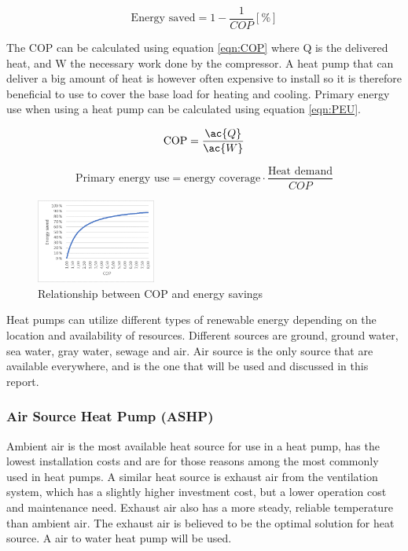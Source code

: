 \begin{equation}
    \mbox{Energy saved} = 1 - \frac{1}{COP} [\%]
    \label{eq:ES}
\end{equation}

The \ac{COP} can be calculated using equation \ref{eqn:COP} where Q is the delivered heat, and W the necessary work done by the compressor. A heat pump that can deliver a big amount of heat is however often expensive to install so it is therefore beneficial to use to cover the base load for heating and cooling. Primary energy use when using a heat pump can be calculated using equation \ref{eqn:PEU}.

\begin{equation} \label{eqn:COP}
    \mbox{COP} = \frac{\ac{Q}}{\ac{W}}
\end{equation}

\begin{equation}\label{eqn:PEU}
    \mbox{Primary energy use} = \mbox{energy coverage} \cdot \frac{\mbox{Heat demand}}{COP}
\end{equation}

\begin{figure}
    \centering
    \includegraphics[width=0.35\textwidth]{vedlegg/cop1.png}
    \caption{Relationship between COP and energy savings}
    \label{fig:c}
 \end{figure}
 
Heat pumps can utilize different types of renewable energy depending on the location and availability of resources. Different sources are ground, ground water, sea water, gray water, sewage and air. Air source is the only source that are available everywhere, and is the one that will be used and discussed in this report. 

\subsubsection*{Air Source Heat Pump (\ac{ASHP})}
Ambient air is the most available heat source for use in a heat pump, has the lowest installation costs and are for those reasons among the most commonly used in heat pumps. A similar heat source is exhaust air from the ventilation system, which has a slightly higher investment cost, but a lower operation cost and maintenance need. Exhaust air also has a more steady, reliable temperature than ambient air. The exhaust air is believed to be the optimal solution for heat source. A air to water heat pump will be used.

